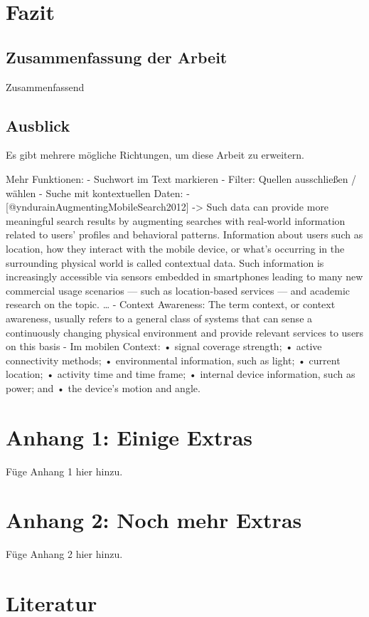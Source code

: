 \documentclass[
  12pt,
  a4paperpaper,
]{report}
\begin{document}
\chapter{Fazit}\label{fazit}

\section{Zusammenfassung der Arbeit}\label{zusammenfassung-der-arbeit}

Zusammenfassend

\section{Ausblick}\label{ausblick}

Es gibt mehrere mögliche Richtungen, um diese Arbeit zu erweitern.

Mehr Funktionen: - Suchwort im Text markieren - Filter: Quellen
ausschließen / wählen - Suche mit kontextuellen Daten: -
{[}@yndurainAugmentingMobileSearch2012{]} -\textgreater{} Such data can
provide more meaningful search results by augmenting searches with
real-world information related to users' profiles and behavioral
patterns. Information about users such as location, how they interact
with the mobile device, or what's occurring in the surrounding physical
world is called contextual data. Such information is increasingly
accessible via sensors embedded in smartphones leading to many new
commercial usage scenarios --- such as location-based services --- and
academic research on the topic. \ldots{} - Context Awareness: The term
context, or context awareness, usually refers to a general class of
systems that can sense a continuously changing physical environment and
provide relevant services to users on this basis - Im mobilen Context: •
signal coverage strength; • active connectivity methods; • environmental
information, such as light; • current location; • activity time and time
frame; • internal device information, such as power; and • the device's
motion and angle.

\chapter*{Anhang 1: Einige Extras}\label{anhang-1-einige-extras}

Füge Anhang 1 hier hinzu.

\chapter*{Anhang 2: Noch mehr Extras}\label{anhang-2-noch-mehr-extras}

Füge Anhang 2 hier hinzu.

\footnotesize

\chapter{Literatur}\label{literatur}
\end{document}
